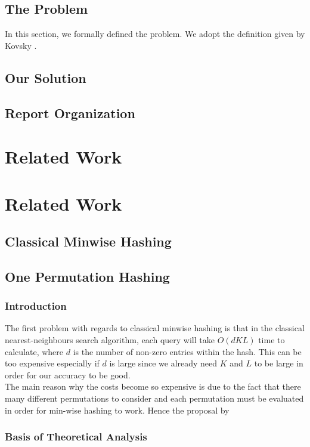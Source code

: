 \documentclass[fyp]{socreport}
\begin{document}
\section{The Problem}
\label{sec: problem}
In this section, we formally defined the problem.  We adopt
the definition given by Kovsky \cite{kovsky92diff}.

\section{Our Solution}
\label{sec :solution}
\section{Report Organization}
\label{sec : org}
\chapter{Related Work}
\label{ch:related}

\chapter{Related Work}
\section{Classical Minwise Hashing}
\section{One Permutation Hashing}
\subsection{Introduction}
The first problem with regards to classical minwise hashing is that in the classical nearest-neighbours search algorithm, each query will take $O(dKL)$ time to calculate, where $d$ is the number of non-zero entries within the hash. This can be too expensive especially if $d$ is large since we already need $K$ and $L$ to be large in order for our accuracy to be good.\\

The main reason why the costs become so expensive is due to the fact that there many different permutations to consider and each permutation must be evaluated in order for min-wise hashing to work. Hence the proposal by \cite{ali94diff}
\subsection{Basis of Theoretical Analysis}
\end{document}
